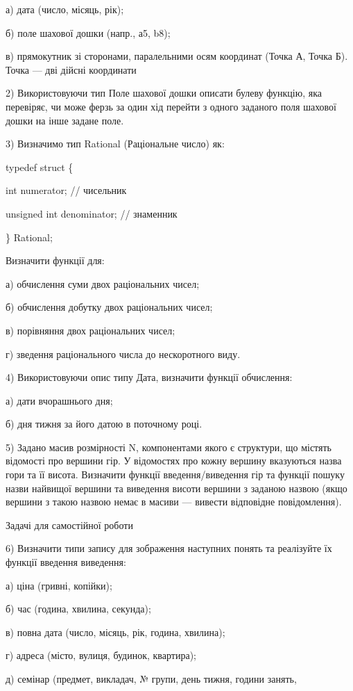 \documentclass[]{article}
\begin{document}
а) дата (число, місяць, рік);

б) поле шахової дошки (напр., а5, b8);

в) \protect\hypertarget{_Hlk65237388}{}{}прямокутник зі сторонами,
паралельними осям координат (Точка А, Точка Б). Точка --- дві дійсні
координати

2) Використовуючи тип Поле шахової дошки описати булеву функцію, яка
перевіряє, чи може ферзь за один хід перейти з одного заданого поля
шахової дошки на інше задане поле.

3) Визначимо тип Rational (Раціональне число) як:

typedef struct \{

int numerator; // чисельник

unsigned int denominator; // знаменник

\} Rational;

Визначити функції для:

а) обчислення суми двох раціональних чисел;

б) обчислення добутку двох раціональних чисел;

в) порівняння двох раціональних чисел;

г) зведення раціонального числа до нескоротного виду.

4) Використовуючи опис типу Дата, визначити функції обчислення:

а) дати вчорашнього дня;

б) дня тижня за його датою в поточному році.

\protect\hypertarget{_Hlk65237504}{}{}5) Задано масив розмірності N,
компонентами якого є структури, що містять відомості про вершини гір. У
відомостях про кожну вершину вказуються назва гори та її висота.
Визначити функції введення/виведення гір та функції пошуку назви
найвищої вершини та виведення висоти вершини з заданою назвою (якщо
вершини з такою назвою немає в масиви --- вивести відповідне
повідомлення).

Задачі для самостійної роботи

6) Визначити типи запису для зображення наступних понять та реалізуйте
їх функції введення виведення:

а) ціна (гривні, копійки);

б) час (година, хвилина, секунда);

в) повна дата (число, місяць, рік, година, хвилина);

г) адреса (місто, вулиця, будинок, квартира);

д) семінар (предмет, викладач, № групи, день тижня, години занять,
\end{document}
